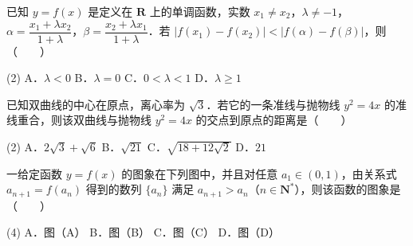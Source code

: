\begin{question}
已知 $y = f(x)$ 是定义在 $\mathbf{R}$ 上的单调函数，实数 $x_1 \neq x_2$，$\lambda \neq -1$，$\alpha = \dfrac{x_1 + \lambda x_2}{1+\lambda}$，$\beta = \dfrac{x_2 + \lambda x_1}{1+\lambda}$．若 $|f(x_1) - f(x_2)| < |f(\alpha) - f(\beta)|$，则\mbox{（　　）}

\begin{gkopts}(2)
\task A．$\lambda < 0$
\task B．$\lambda = 0$
\task C．$0 < \lambda < 1$
\task D．$\lambda \geqslant 1$
\end{gkopts}

\end{question}
\begin{question}
已知双曲线的中心在原点，离心率为 $\sqrt{3}$．若它的一条准线与抛物线 $y^2 = 4x$ 的准线重合，则该双曲线与抛物线 $y^2 = 4x$ 的交点到原点的距离是\mbox{（　　）}

\begin{gkopts}(2)
\task A．$2\sqrt{3} + \sqrt{6}$
\task B．$\sqrt{21}$
\task C．$\sqrt{18 + 12\sqrt{2}}$
\task D．$21$
\end{gkopts}

\Needspace{0.4\textheight}
\end{question}
\begin{question}
一给定函数 $y = f(x)$ 的图象在下列图中，并且对任意 $a_1 \in (0, 1)$，由关系式 $a_{n+1} = f(a_n)$ 得到的数列 $\{a_n\}$ 满足 $a_{n+1} > a_n$（$n \in \mathbf{N}^*$），则该函数的图象是\mbox{（　　）}
\nopagebreak[4]
\begin{center}\end{center}
\nopagebreak[4]
\begin{gkopts}(4)
\task A．图（A）
\task B．图（B）
\task C．图（C）
\task D．图（D）
\end{gkopts}

\end{question}

